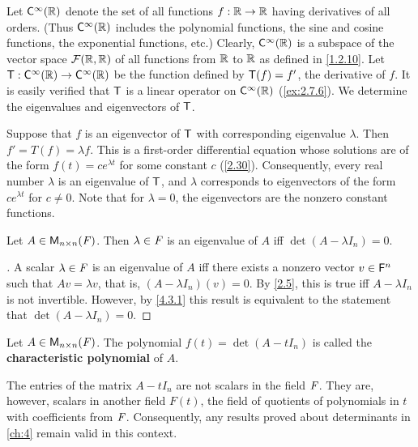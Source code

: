 \begin{eg}\label{5.1.4}
  Let \(\cfs[\infty](\R)\) denote the set of all functions \(f : \mathbb{R} \to \mathbb{R}\) having derivatives of all orders.
  (Thus \(\cfs[\infty](\R)\) includes the polynomial functions, the sine and cosine functions, the exponential functions, etc.)
  Clearly, \(\cfs[\infty](\R)\) is a subspace of the vector space \(\mathcal{F}(\mathbb{R}, \mathbb{R})\) of all functions from \(\mathbb{R}\) to \(\mathbb{R}\) as defined in \cref{1.2.10}.
  Let \(\T : \cfs[\infty](\R) \to \cfs[\infty](\R)\) be the function defined by \(\mathsf{T}(f) = f'\), the derivative of \(f\).
  It is easily verified that \(\mathsf{T}\) is a linear operator on \(\cfs[\infty](\R)\) (\cref{ex:2.7.6}).
  We determine the eigenvalues and eigenvectors of \(\mathsf{T}\).

  Suppose that \(f\) is an eigenvector of \(\mathsf{T}\) with corresponding eigenvalue \(\lambda\).
  Then \(f' = T(f) = \lambda f\).
  This is a first-order differential equation whose solutions are of the form \(f(t) = ce^{\lambda t}\) for some constant \(c\) (\cref{2.30}).
  Consequently, every real number \(\lambda\) is an eigenvalue of \(\mathsf{T}\), and \(\lambda\) corresponds to eigenvectors of the form \(ce^{\lambda t}\) for \(c \neq 0\).
  Note that for \(\lambda = 0\), the eigenvectors are the nonzero constant functions.
\end{eg}

\begin{thm}\label{5.2}
  Let \(A \in \mathsf{M}_{{n} \times n}({\mathit{F}})\).
  Then \(\lambda \in \mathit{F}\) is an eigenvalue of \(A\) iff \(\det(A - \lambda I_n) = 0\).
\end{thm}

\begin{proof}[]
  A scalar \(\lambda \in \mathit{F}\) is an eigenvalue of \(A\) iff there exists a nonzero vector \(v \in \mathsf{F}^n\) such that \(Av = \lambda v\), that is, \((A - \lambda I_n)(v) = 0\).
  By \cref{2.5}, this is true iff \(A - \lambda I_n\) is not invertible.
  However, by \cref{4.3.1} this result is equivalent to the statement that \(\det(A - \lambda I_n) = 0\).
\end{proof}

\begin{defn}\label{5.1.5}
  Let \(A \in \mathsf{M}_{{n} \times n}({\mathit{F}})\).
  The polynomial \(f(t) = \det(A - t I_n)\) is called the \textbf{characteristic polynomial} of \(A\).
\end{defn}

\begin{note}
  The entries of the matrix \(A - t I_n\) are not scalars in the field \(\mathit{F}\).
  They are, however, scalars in another field \(F(t)\), the field of quotients of polynomials in \(t\) with coefficients from \(\mathit{F}\).
  Consequently, any results proved about determinants in \cref{ch:4} remain valid in this context.
\end{note}

